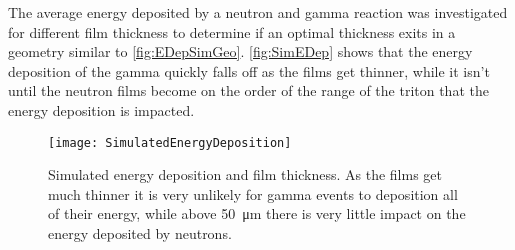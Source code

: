 
The average energy deposited by a neutron and gamma reaction was investigated for different film thickness to determine if an optimal thickness exits in a geometry similar to \autoref{fig:EDepSimGeo}.
\autoref{fig:SimEDep} shows that the energy deposition of the gamma quickly falls off as the films get thinner, while it isn't until the neutron films become on the order of the range of the triton that the energy deposition is impacted.
\begin{figure}
  \centering
  \texttt{[image: SimulatedEnergyDeposition]}
  \caption[Simulated Energy Deposition and Film Thickness]{Simulated energy deposition and film thickness.  As the films get much thinner it is very unlikely for gamma events to deposition all of their energy, while above \SI{50}{\um} there is very little impact on the energy deposited by neutrons.}
  \label{fig:SimEDep}
\end{figure}

